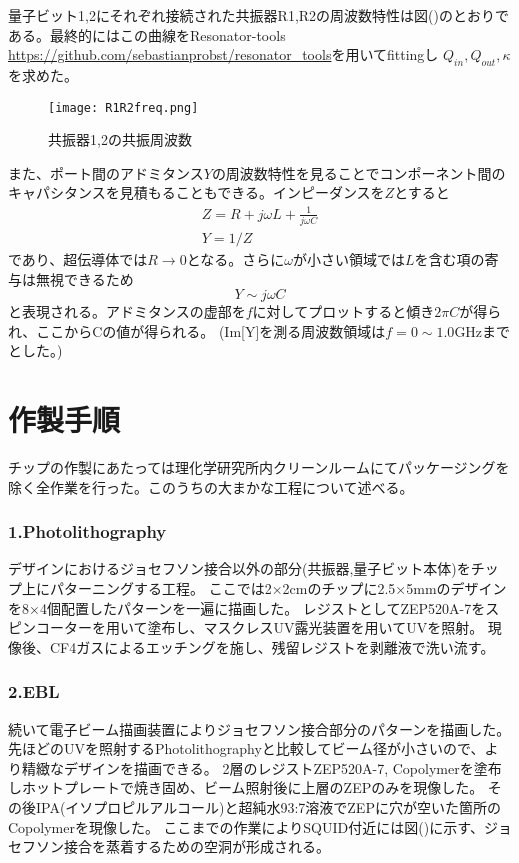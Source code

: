量子ビット1,2にそれぞれ接続された共振器R1,R2の周波数特性は図()のとおりである。最終的にはこの曲線をResonator-tools \url{https://github.com/sebastianprobst/resonator_tools}を用いてfittingし
$Q_{in},Q_{out},\kappa$を求めた。
\begin{figure}[H]
    \begin{center}
        \texttt{[image: R1R2freq.png]}
        \caption{共振器1,2の共振周波数}
    \end{center}
\end{figure}
また、ポート間のアドミタンス$Y$の周波数特性を見ることでコンポーネント間のキャパシタンスを見積もることもできる。インピーダンスを$Z$とすると
\begin{equation}
\begin{aligned}
    Z = R + j\omega L + \frac{1}{j\omega C} \\
    Y = 1/Z
\end{aligned}
\end{equation}
であり、超伝導体では$R \to 0$となる。さらに$\omega$が小さい領域では$L$を含む項の寄与は無視できるため
\begin{equation}
        Y \sim j\omega C
\end{equation}
と表現される。アドミタンスの虚部を$f$に対してプロットすると傾き$2\pi C$が得られ、ここからCの値が得られる。
(Im[Y]を測る周波数領域は$f=0 \sim 1.0$GHzまでとした。)
\section{作製手順}
チップの作製にあたっては理化学研究所内クリーンルームにてパッケージングを除く全作業を行った。このうちの大まかな工程について述べる。
\subsubsection{1.Photolithography}
デザインにおけるジョセフソン接合以外の部分(共振器,量子ビット本体)をチップ上にパターニングする工程。
ここでは2×2cmのチップに2.5×5mmのデザインを8×4個配置したパターンを一遍に描画した。
レジストとしてZEP520A-7をスピンコーターを用いて塗布し、マスクレスUV露光装置を用いてUVを照射。
現像後、CF4ガスによるエッチングを施し、残留レジストを剥離液で洗い流す。
\subsubsection{2.EBL}
続いて電子ビーム描画装置によりジョセフソン接合部分のパターンを描画した。
先ほどのUVを照射するPhotolithographyと比較してビーム径が小さいので、より精緻なデザインを描画できる。
2層のレジストZEP520A-7, Copolymerを塗布しホットプレートで焼き固め、ビーム照射後に上層のZEPのみを現像した。
その後IPA(イソプロピルアルコール)と超純水93:7溶液でZEPに穴が空いた箇所のCopolymerを現像した。
ここまでの作業によりSQUID付近には図()に示す、ジョセフソン接合を蒸着するための空洞が形成される。
